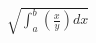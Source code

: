 \documentclass[preview]{standalone}
\begin{document}
\begin{align*}
\sqrt{ \int_{ a}^ {b} \left( \frac{x}{y} \right) dx}
\end{align*}
\end{document}
